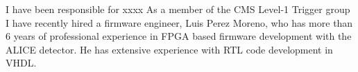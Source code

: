\documentclass[preprint,12pt]{elsarticle}
\begin{document}

I have been responsible for xxxx
As a member of the CMS Level-1 Trigger group I have recently hired a firmware
engineer, Luis Perez Moreno, who has more than 6 years of professional experience in
FPGA based firmware development with the ALICE detector. 
He has extensive experience with RTL code development in VHDL. 

\newpage




%

%
\printbibliography






\end{document}
